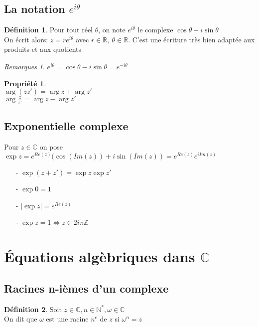 \documentclass[fleqn]{article}
\theoremstyle{definition} \newtheorem*{defi}{D\'efinition}
\theoremstyle{definition} \newtheorem*{theo}{Th\'eor\`eme}
\theoremstyle{definition} \newtheorem*{coro}{Corollaire}
\theoremstyle{remark} \newtheorem*{rqs}{Remarques}
\theoremstyle{definition} \newtheorem*{prop}{Propri\'et\'e}
\begin{document}
\subsection{La notation $e^{i \theta}$}
\begin{defi}
	Pour tout r\'eel $\theta$, on note $e^{i\theta}$ le complexe $\cos \theta + i \sin \theta$\\
	On \'ecrit alors: $z = re^{i\theta}$ avec $r \in \mathbb{R},\ \theta \in \mathbb{R}$. C'est une \'ecriture tr\`es bien adapt\'ee aux produits
	et aux quotients
	\begin{rqs}
		$\overline{e^{i\theta}} = \cos \theta - i \sin \theta = e^{-i\theta}$
	\end{rqs}
\end{defi}
\begin{prop} $ $ \\
	$\arg (zz') = \arg z + \arg z'$\\
	$\arg \frac{z}{z'}  = \arg z  - \arg z'$
\end{prop}

\subsection{Exponentielle complexe}
Pour $z \in \mathbb{C}$ on pose $\exp z = e^{Re(z)}(\cos(Im(z)) + i\sin(Im(z)) =  e^{Re(z)} e^{iIm(z)}$
\begin{itemize}
	\item [-] $\exp (z + z') = \exp z \exp z'$
	\item [-] $\exp 0 = 1$
	\item [-] $|\exp z| = e^{Re(z)}$
	\item [-] $\exp z = 1 \Leftrightarrow z \in 2i\pi\mathbb{Z}$
\end{itemize}

\section{\'Equations alg\`ebriques dans $\mathbb{C}$}

\subsection{Racines n-i\`emes d'un complexe}
\begin{defi} Soit $z \in \mathbb{C}, n \in \mathbb{N}^*, \omega \in \mathbb{C}$ \\
	On dit que $\omega$ est une racine $n^e$ de $z$ si $\omega^n = z$
\end{defi}
\end{document}
